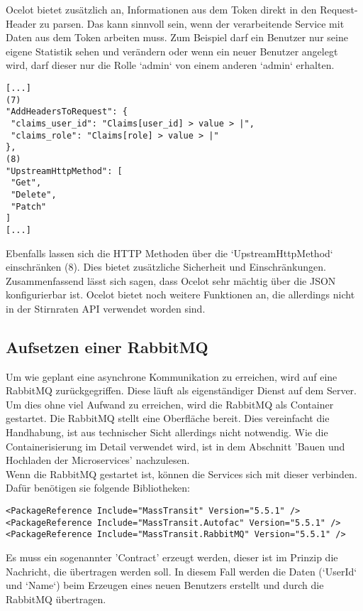Ocelot bietet zusätzlich an, Informationen aus dem Token direkt in den Request-Header zu parsen. Das kann sinnvoll sein, wenn der verarbeitende Service mit Daten aus dem Token arbeiten muss. Zum Beispiel darf ein Benutzer nur seine eigene Statistik sehen und verändern oder wenn ein neuer Benutzer angelegt wird, darf dieser nur die Rolle `admin` von einem anderen `admin` erhalten.  

\begin{verbatim}
[...]
(7)
"AddHeadersToRequest": {
 "claims_user_id": "Claims[user_id] > value > |",
 "claims_role": "Claims[role] > value > |"
},
(8)
"UpstreamHttpMethod": [
 "Get",
 "Delete",
 "Patch"
]
[...]
\end{verbatim}

Ebenfalls lassen sich die HTTP Methoden über die `UpstreamHttpMethod` einschränken (8). Dies bietet zusätzliche Sicherheit und Einschränkungen. \\

Zusammenfassend lässt sich sagen, dass Ocelot sehr mächtig über die JSON konfigurierbar ist. Ocelot bietet noch weitere Funktionen an, die allerdings nicht in der Stirnraten API verwendet worden sind.  

\subsection{Aufsetzen einer RabbitMQ}

Um wie geplant eine asynchrone Kommunikation zu erreichen, wird auf eine RabbitMQ zurückgegriffen. Diese läuft als eigenständiger Dienst auf dem Server. Um dies ohne viel Aufwand zu erreichen, wird die RabbitMQ als Container gestartet. Die RabbitMQ stellt eine Oberfläche bereit. Dies vereinfacht die Handhabung, ist aus technischer Sicht allerdings nicht notwendig. Wie die Containerisierung im Detail verwendet wird, ist in dem Abschnitt 'Bauen und Hochladen der Microservices' nachzulesen.\\

Wenn die RabbitMQ gestartet ist, können die Services sich mit dieser verbinden. Dafür benötigen sie folgende Bibliotheken:

\begin{verbatim}
<PackageReference Include="MassTransit" Version="5.5.1" />
<PackageReference Include="MassTransit.Autofac" Version="5.5.1" />
<PackageReference Include="MassTransit.RabbitMQ" Version="5.5.1" />
\end{verbatim}

Es muss ein sogenannter 'Contract' erzeugt werden, dieser ist im Prinzip die Nachricht, die übertragen werden soll. In diesem Fall werden die Daten (`UserId` und `Name`) beim Erzeugen eines neuen Benutzers erstellt und durch die RabbitMQ übertragen.

